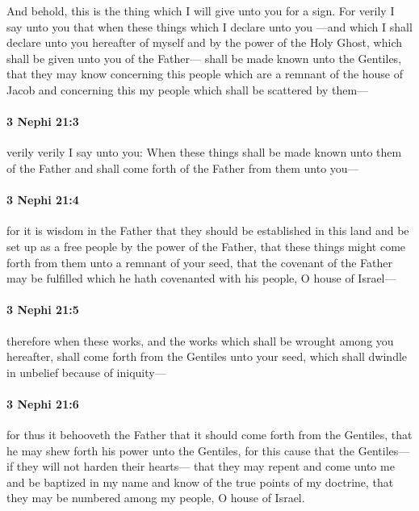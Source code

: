 			And behold, this is the thing which I will give unto you for a sign.
			For verily I say unto you
			that when these things which I declare unto you
			---and which I shall declare unto you hereafter of myself
			and by the power of the Holy Ghost,
			which shall be given unto you of the Father---
			shall be made known unto the Gentiles,
			that they may know concerning this people
			which are a remnant of the house of Jacob
			and concerning this my people which shall be scattered by them---

		\paragraph{3 Nephi 21:3} %
			\label{3NEPHI-21-3}

			verily verily I say unto you:
			When these things shall be made known unto them of the Father
			and shall come forth of the Father from them unto you---

		\paragraph{3 Nephi 21:4} %
			\label{3NEPHI-21-4}

			for it is wisdom in the Father
			that they should be established in this land
			and be set up as a free people by the power of the Father,
			that these things might come forth from them unto a remnant of your seed,
			that the covenant of the Father may be fulfilled
			which he hath covenanted with his people, O house of Israel---

		\paragraph{3 Nephi 21:5} %
			\label{3NEPHI-21-5}

			therefore when these works,
			and the works which shall be wrought among you hereafter,
			shall come forth from the Gentiles unto your seed,
			which shall dwindle in unbelief because of iniquity---

		\paragraph{3 Nephi 21:6} %
			\label{3NEPHI-21-6}

			for thus it behooveth the Father
			that it should come forth from the Gentiles,
			that he may shew forth his power unto the Gentiles,
			for this cause that the Gentiles---if they will not harden their hearts---
			that they may repent and come unto me and be baptized in my name
			and know of the true points of my doctrine,
			that they may be numbered among my people, O house of Israel.

